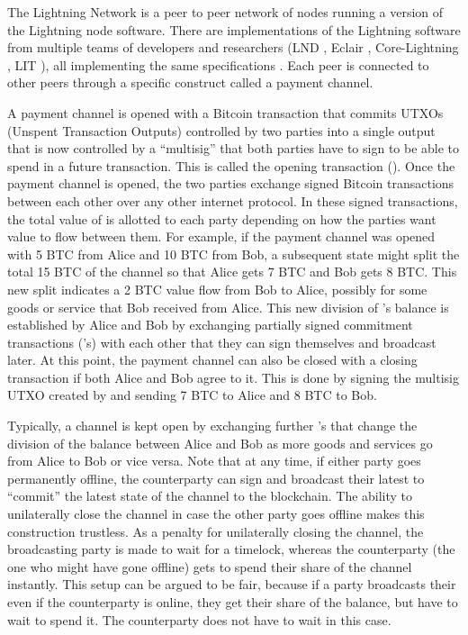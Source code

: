 The Lightning Network is a peer to peer network of nodes running a version of the Lightning node software. There are implementations of the Lightning software from multiple teams of developers and researchers (LND \cite{lnd}, Eclair \cite{eclair}, Core-Lightning \cite{c_lightning}, LIT \cite{lit}), all implementing the same specifications \cite{bolt}. Each peer is connected to other peers through a specific construct called a payment channel.

A payment channel is opened with a Bitcoin transaction that commits UTXOs (Unspent Transaction Outputs) controlled by two parties into a single output that is now controlled by a ``multisig'' that both parties have to sign to be able to spend in a future transaction. This is called the opening transaction (\topen{}). Once the payment channel is opened, the two parties exchange signed Bitcoin transactions between each other over any other internet protocol. In these signed transactions, the total value of \topen{} is allotted to each party depending on how the parties want value to flow between them. For example, if the payment channel was opened with 5 BTC from Alice and 10 BTC from Bob, a subsequent state might split the total 15 BTC of the channel so that Alice gets 7 BTC and Bob gets 8 BTC. This new split indicates a 2 BTC value flow from Bob to Alice, possibly for some goods or service that Bob received from Alice. This new division of \topen{}'s balance is established by Alice and Bob by exchanging partially signed commitment transactions (\ctx{}'s) with each other that they can sign themselves and broadcast later. At this point, the payment channel can also be closed with a closing transaction if both Alice and Bob agree to it. This is done by signing the multisig UTXO created by \topen{} and sending 7 BTC to Alice and 8 BTC to Bob. 

Typically, a channel is kept open by exchanging further \ctx{}'s that change the division of the balance between Alice and Bob as more goods and services go from Alice to Bob or vice versa. Note that at any time, if either party goes permanently offline, the counterparty can sign and broadcast their latest \ctx{} to ``commit'' the latest state of the channel to the blockchain. The ability to unilaterally close the channel in case the other party goes offline makes this construction trustless. As a penalty for unilaterally closing the channel, the broadcasting party is made to wait for a timelock, whereas the counterparty (the one who might have gone offline) gets to spend their share of the channel instantly. This setup can be argued to be fair, because if a party broadcasts their \ctx{} even if the counterparty is online, they get their share of the balance, but have to wait to spend it. The counterparty does not have to wait in this case.

